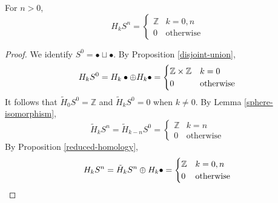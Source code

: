 \begin{prop}
For $n>0$,
$$H_kS^n=\begin{cases}\mathbb{Z}&k=0,n \\ 0 & \text{otherwise}\end{cases}$$
\end{prop}
\begin{proof}
We identify $S^{0}=\bullet \sqcup \bullet$. By Proposition \ref{disjoint-union}, $$H_k S^{0}=H_k\bullet \oplus H_k \bullet=\begin{cases}\mathbb{Z}\times \mathbb{Z} &k=0\\ 0 & \text{otherwise}\end{cases}$$ It follows that $\tilde{H}_0S^{0}=\mathbb{Z}$ and $\tilde{H}_kS^{0}=0$ when $k\neq 0$. By Lemma \ref{sphere-isomorphism}, $$\tilde{H}_kS^n=\tilde{H}_{k-n}S^{0}=\begin{cases}\mathbb{Z} & k=n\\0 & \text{otherwise}\end{cases}$$
By Proposition \ref{reduced-homology}, $$H_kS^n=\tilde{H}_kS^n\oplus H_k\bullet=\begin{cases}\mathbb{Z}&k=0,n \\ 0 & \text{otherwise}\end{cases}$$
\cite{Werndli}
\end{proof}
